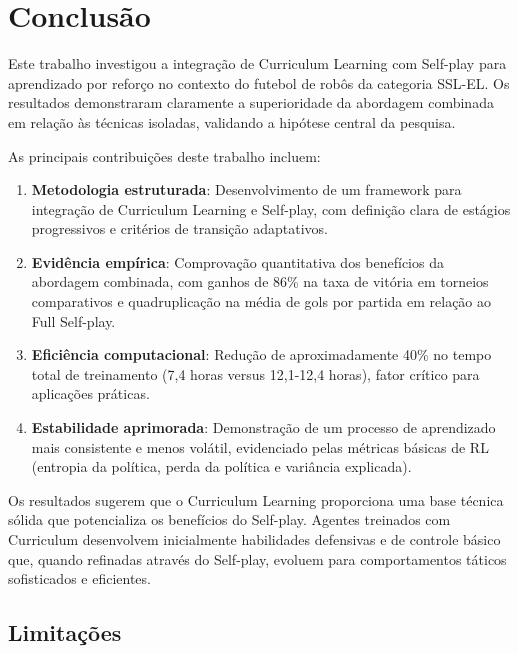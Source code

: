 \chapter{Conclusão}
\label{cap:conclusao}

Este trabalho investigou a integração de Curriculum Learning com Self-play para aprendizado por reforço no contexto do futebol de robôs da categoria SSL-EL. Os resultados demonstraram claramente a superioridade da abordagem combinada em relação às técnicas isoladas, validando a hipótese central da pesquisa.

As principais contribuições deste trabalho incluem:

\begin{enumerate}
    \item \textbf{Metodologia estruturada}: Desenvolvimento de um framework para integração de Curriculum Learning e Self-play, com definição clara de estágios progressivos e critérios de transição adaptativos.
    
    \item \textbf{Evidência empírica}: Comprovação quantitativa dos benefícios da abordagem combinada, com ganhos de 86\% na taxa de vitória em torneios comparativos e quadruplicação na média de gols por partida em relação ao Full Self-play.
    
    \item \textbf{Eficiência computacional}: Redução de aproximadamente 40\% no tempo total de treinamento (7,4 horas versus 12,1-12,4 horas), fator crítico para aplicações práticas.
    
    \item \textbf{Estabilidade aprimorada}: Demonstração de um processo de aprendizado mais consistente e menos volátil, evidenciado pelas métricas básicas de RL (entropia da política, perda da política e variância explicada).
\end{enumerate}

Os resultados sugerem que o Curriculum Learning proporciona uma base técnica sólida que potencializa os benefícios do Self-play. Agentes treinados com Curriculum desenvolvem inicialmente habilidades defensivas e de controle básico que, quando refinadas através do Self-play, evoluem para comportamentos táticos sofisticados e eficientes.

\section{Limitações}

